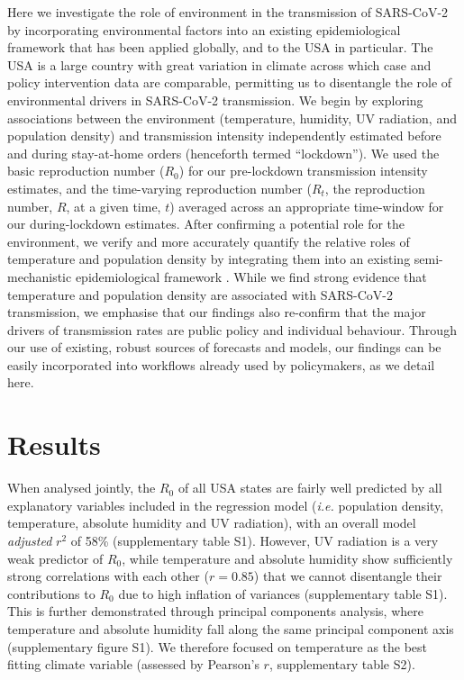 \documentclass[12pt,english,a4paper]{article}
\newcommand{\virus}{SARS-CoV-2\xspace}
\newcommand{\RO}{$R_0$\xspace}
\begin{document}
Here we investigate the role of environment in the transmission of \virus by incorporating environmental factors into an existing epidemiological framework that has been applied globally\cite{Flaxman2020a,Mellan2020,Vollmer2020}, and to the USA in particular\cite{Unwin2020a}. The USA is a large country with great variation in climate across which case and policy intervention data are comparable, permitting us to disentangle the role of environmental drivers in \virus transmission.
We begin by exploring associations between the environment (temperature, humidity, UV radiation, and population density) and transmission intensity independently estimated before and during stay-at-home orders (henceforth termed ``lockdown''). We used the basic reproduction number (\RO) for our pre-lockdown transmission intensity estimates, and the time-varying reproduction number ($R_t$, the reproduction number, $R$, at a given time, $t$) averaged across an appropriate time-window for our during-lockdown estimates.
After confirming a potential role for the environment, we verify and more accurately quantify the relative roles of temperature and population density by integrating them into an existing semi-mechanistic epidemiological framework \cite{Unwin2020a}.
While we find strong evidence that temperature and population density are associated with \virus transmission, we emphasise that our findings also re-confirm that the major drivers of transmission rates are public policy and individual behaviour. Through our use of existing, robust sources of forecasts and models, our findings can be easily incorporated into workflows already used by policymakers, as we detail here.

\clearpage

\section*{Results}

When analysed jointly, the \RO of all USA states are fairly well predicted by all explanatory variables included in the regression model (\emph{i.e.} population density, temperature, absolute humidity and UV radiation), with an overall model \textsl{adjusted} $r^2$ of 58\% (supplementary table S1). However, UV radiation is a very weak predictor of \RO, while temperature and absolute humidity show sufficiently strong correlations with each other ($r = 0.85$) that we cannot disentangle their contributions to \RO due to high inflation of variances (supplementary table S1). This is further demonstrated through principal components analysis, where temperature and absolute humidity fall along the same principal component axis (supplementary figure S1). We therefore focused on temperature as the best fitting climate variable (assessed by Pearson's $r$, supplementary table S2).
\end{document}
